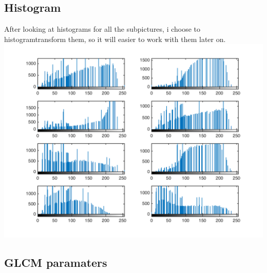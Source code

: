 \documentclass{article}
\begin{document}
\subsection{Histogram}
After looking at histograms for all the subpictures, i choose to histogramtransform them, so it will easier to work with them later on.\\
\includegraphics[totalheight=8cm]{detailhist.png}
    	
\subsection{GLCM paramaters}    	
\end{document}

